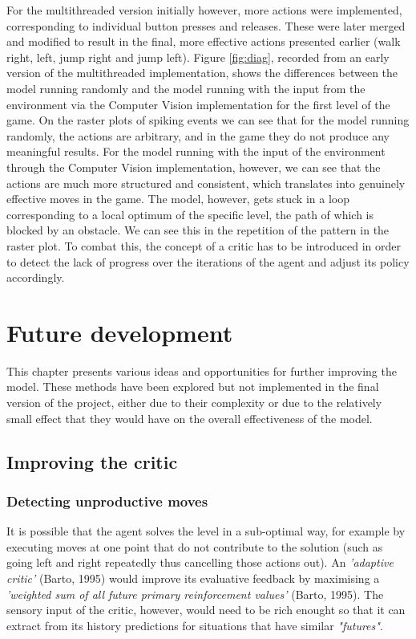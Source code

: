 \documentclass[10pt]{article}
\begin{document}
    For the multithreaded version initially however, more actions were implemented, corresponding to individual button presses and releases. These were later merged and modified to result in the final, more effective actions presented earlier (walk right, left, jump right and jump left). Figure \ref{fig:diag}, recorded from an early version of the multithreaded implementation, shows the differences between the model running randomly and the model running with the input from the environment via the Computer Vision implementation for the first level of the game. On the raster plots of spiking events we can see that for the model running randomly, the actions are arbitrary, and in the game they do not produce any meaningful results. For the model running with the input of the environment through the Computer Vision implementation, however, we can see that the actions are much more structured and consistent, which translates into genuinely effective moves in the game. The model, however, gets stuck in a loop corresponding to a local optimum of the specific level, the path of which is blocked by an obstacle. We can see this in the repetition of the pattern in the raster plot. To combat this, the concept of a critic has to be introduced in order to detect the lack of progress over the iterations of the agent and adjust its policy accordingly.

    \section{Future development}

    This chapter presents various ideas and opportunities for further improving the model. These methods have been explored but not implemented in the final version of the project, either due to their complexity or due to the relatively small effect that they would have on the overall effectiveness of the model.

    \subsection{Improving the critic}

    \subsubsection{Detecting unproductive moves}

    It is possible that the agent solves the level in a sub-optimal way, for example by executing moves at one point that do not contribute to the solution (such as going left and right repeatedly thus cancelling those actions out). An \textit{'adaptive critic'} (Barto, 1995) would improve its evaluative feedback by maximising a \textit{'weighted sum of all future primary reinforcement values'} (Barto, 1995). The sensory input of the critic, however, would need to be rich enought so that it can extract from its history predictions for situations that have similar \textit{"futures"}.
\end{document}
